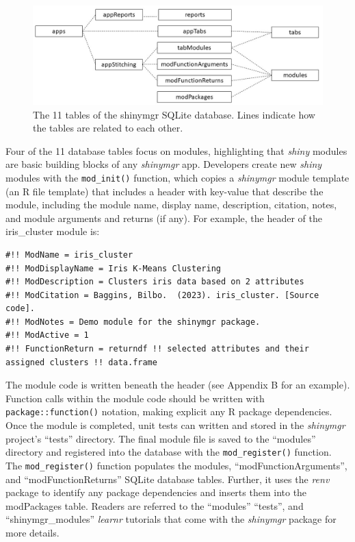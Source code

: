 \begin{figure}[b]
\includegraphics[width=1\linewidth]{images/figure4} \caption{The 11 tables of the shinymgr SQLite database. Lines indicate how the tables are related to each other.}\label{fig:fig4}
\end{figure}

Four of the 11 database tables focus on modules, highlighting that \emph{shiny} modules are basic building blocks of any \emph{shinymgr} app. Developers create new \emph{shiny} modules with the \texttt{mod\_init()} function, which copies a \emph{shinymgr} module template (an R file template) that includes a header with key-value that describe the module, including the module name, display name, description, citation, notes, and module arguments and returns (if any). For example, the header of the iris\_cluster module is:

\begin{verbatim}
#!! ModName = iris_cluster
#!! ModDisplayName = Iris K-Means Clustering
#!! ModDescription = Clusters iris data based on 2 attributes
#!! ModCitation = Baggins, Bilbo.  (2023). iris_cluster. [Source code].
#!! ModNotes = Demo module for the shinymgr package.
#!! ModActive = 1
#!! FunctionReturn = returndf !! selected attributes and their assigned clusters !! data.frame
\end{verbatim}

The module code is written beneath the header (see Appendix B for an example). Function calls within the module code should be written with \texttt{package::function()} notation, making explicit any R package dependencies. Once the module is completed, unit tests can written and stored in the \emph{shinymgr} project's ``tests'' directory. The final module file is saved to the ``modules'' directory and registered into the database with the \texttt{mod\_register()} function. The \texttt{mod\_register()} function populates the modules, ``modFunctionArguments'', and ``modFunctionReturns'' SQLite database tables. Further, it uses the \emph{renv} package to identify any package dependencies and inserts them into the modPackages table. Readers are referred to the ``modules'' ``tests'', and ``shinymgr\_modules'' \emph{learnr} tutorials that come with the \emph{shinymgr} package for more details.

